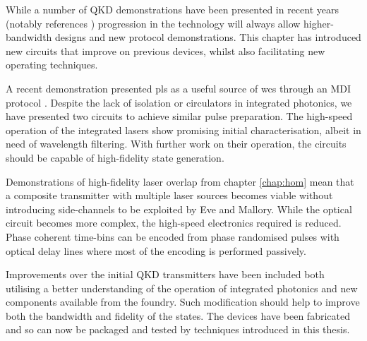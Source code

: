 While a number of \ac{QKD} demonstrations have been presented in recent years (notably references \cite{Sibson2017InP, Sibson2017Si, semenenko2019mdi, zhang2019integrated, ma2016silicon}) progression in the technology will always allow higher-bandwidth designs and new protocol demonstrations. This chapter has introduced new circuits that improve on previous devices, whilst also facilitating new operating techniques.

A recent demonstration presented \ac{pls} as a useful source of \ac{wcs} through an \ac{MDI} protocol \cite{Comandar2016}. Despite the lack of isolation or circulators in integrated photonics, we have presented two circuits to achieve similar pulse preparation. The high-speed operation of the integrated lasers show promising initial characterisation, albeit in need of wavelength filtering. With further work on their operation, the circuits should be capable of high-fidelity state generation.

Demonstrations of high-fidelity laser overlap from chapter \ref{chap:hom} mean that a composite transmitter with multiple laser sources becomes viable without introducing side-channels to be exploited by Eve and Mallory. While the optical circuit becomes more complex, the high-speed electronics required is reduced. Phase coherent time-bins can be encoded from phase randomised pulses with optical delay lines where most of the encoding is performed passively. 

Improvements over the initial \ac{QKD} transmitters have been included both utilising a better understanding of the operation of integrated photonics and new components available from the foundry. Such modification should help to improve both the bandwidth and fidelity of the states. The devices have been fabricated and so can now be packaged and tested by techniques introduced in this thesis.

